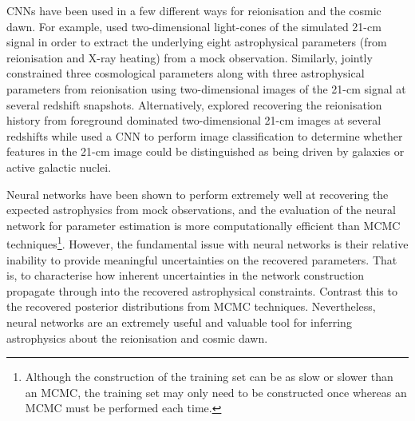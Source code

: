 CNNs have been used in a few different ways for reionisation and the cosmic dawn. For example, \cite{Gillet:2019} used two-dimensional light-cones of the simulated 21-cm signal in order to extract the underlying eight astrophysical parameters (from reionisation and X-ray heating) from a mock observation. Similarly, \cite{Hassan:2019b} jointly constrained three cosmological parameters along with three astrophysical parameters from reionisation using two-dimensional images of the 21-cm signal at several redshift snapshots.  Alternatively, \cite{LaPlante:2018} explored recovering the reionisation history from foreground dominated two-dimensional 21-cm images at several redshifts while \cite{Hassan:2019a} used a CNN to perform image classification to determine whether features in the 21-cm image could be distinguished as being driven by galaxies or active galactic nuclei.

Neural networks have been shown to perform extremely well at recovering the expected astrophysics from mock observations, and the evaluation of the neural network for parameter estimation is more computationally efficient than MCMC techniques\footnote{Although the construction of the training set can be as slow or slower than an MCMC, the training set may only need to be constructed once whereas an MCMC must be performed each time.}. However, the fundamental issue with neural networks is their relative inability to provide meaningful uncertainties on the recovered parameters. That is, to characterise how inherent uncertainties in the network construction propagate through into the recovered astrophysical constraints. Contrast this to the recovered posterior distributions from MCMC techniques. Nevertheless, neural networks are an extremely useful and valuable tool for inferring astrophysics about the reionisation and cosmic dawn.





